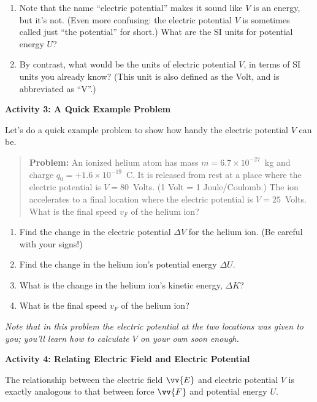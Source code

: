 \begin{enumerate}[labparts]
\item Note that the name ``electric potential'' makes it sound like $V$ is an energy, but it's not.  (Even more confusing: the electric potential $V$ is sometimes called just ``the potential'' for short.)  What are the SI units for potential energy $U$?  
\answerspace{0.3in}

\item By contrast, what would be the units of electric potential $V$, in terms of SI units you already know?  (This unit is also defined as the Volt, and is abbreviated as ``V''.)
\answerspace{0.3in}

\end{enumerate}

\pagebreak[2]
\textbf{Activity 3: A Quick Example Problem}

Let's do a quick example problem to show how handy the electric potential $V$ can be.  
\begin{quote}
\textbf{Problem:} An ionized helium atom has mass $m=6.7\times 10^{-27}$~kg and charge $q_0=+1.6\times 10^{-19}$~C.  It is released from rest at a place where the electric potential is $V = 80$~Volts.  (1 Volt = 1 Joule/Coulomb.)  The ion accelerates to a final location where the electric potential is $V= 25$~Volts.  What is the final speed $v_F$ of the helium ion?  
\end{quote}
\begin{enumerate}[labparts]
\item Find the change in the electric potential $\Delta V$ for the helium ion.  (Be careful with your signs!)
\answerspace{0.3in}

\item Find the change in the helium ion's potential energy $\Delta U$.  
\answerspace{0.3in}

\item What is the change in the helium ion's kinetic energy, $\Delta K$? 
\answerspace{0.3in}

\item What is the final speed $v_F$ of the helium ion?
\answerspace{0.6in}

\end{enumerate}
\textit{Note that in this problem the electric potential at the two locations was given to you; you'll learn how to calculate $V$ on your own soon enough.}

\bigskip
\textbf{Activity 4: Relating Electric Field and Electric Potential}

The relationship between the electric field $\vv{E}$ and electric potential $V$ is exactly analogous to that between force $\vv{F}$ and potential energy $U$.  

